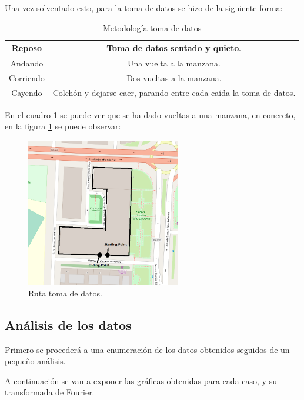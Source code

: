 \documentclass[12pt]{article}
\numberwithin{equation}{section}
\begin{document}
Una vez solventado esto, para la toma de datos se hizo de la siguiente forma:

\begin{center}
\begin{table}
\caption{Metodología toma de datos}
\begin{tabular}{| c | c |}
\hline
Reposo & Toma de datos sentado y quieto. \\
\hline
Andando & Una vuelta a la manzana. \\
\hline
Corriendo & Dos vueltas a la manzana. \\
\hline
Cayendo & Colchón y dejarse caer, parando entre cada caída la toma de datos. \\
\hline
\end{tabular}
\label{tabla1}
\end{table}
\end{center}

En el cuadro \ref{tabla1} se puede ver que se ha dado vueltas a una manzana, en concreto, en la figura \ref{fig:cuadra} se puede observar:

\begin{figure}[h]
    \centering
    \includegraphics[width=0.6\textwidth]{plaza.png}
    \caption{Ruta toma de datos.}
    \label{fig:cuadra}
\end{figure}



\subsection{Análisis de los datos}
Primero se procederá a una enumeración de los datos obtenidos seguidos de un pequeño análisis.

A continuación se van a exponer las gráficas obtenidas para cada caso, y su transformada de Fourier.
\end{document}
